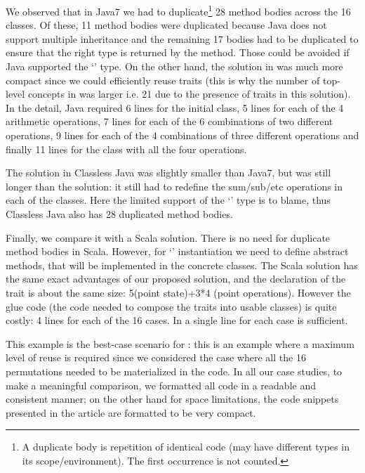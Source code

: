 \noindent We observed that in Java7 we had to duplicate\footnote{A duplicate body is repetition of identical code (may have different types in its scope/environment). The first occurrence is not counted. } 28 method bodies across the 16 classes.
Of these, 11 method bodies were duplicated because Java does not support multiple inheritance
 and the remaining 17 bodies had to be duplicated to ensure that the right type
 is returned by the method. Those could be avoided if Java supported
 the `\Q@This@' type.
 On the other hand, the solution in \name was much more compact since we could efficiently
reuse traits (this is why the number of top-level concepts in \name was larger i.e. 21 due to the
 presence of traits in this solution).
In the detail, Java required 6 lines for the initial \Q@Point@ class,
5 lines for each of the 4 arithmetic operations, 7 lines for each of the 6 combinations
of two different operations, 9 lines for each of the 4 combinations of three different 
operations and finally 11 lines for the class with all the four operations.


 The solution in Classless Java was slightly smaller than Java7,
 but was still longer than the \name solution: it still had to redefine the
 sum/sub/etc operations in each of the classes. Here the limited
 support of the `\Q@This@' type is to blame, thus Classless Java also has 28 duplicated method bodies.

Finally, we compare it with a Scala solution.
There is no need for duplicate method bodies in Scala.
However, for `\Q@This@' instantiation we need to define abstract methods, that will be implemented in the concrete classes.
The Scala solution has the same exact advantages
of our proposed solution, and the declaration
of the trait is about the same size: 
5(point state)+3*4 (point operations).
However the glue code (the code needed to compose the traits into usable classes) is quite costly:
4 lines for each of the 16 cases.
In \name a single line for each case is sufficient.

This example is the best-case scenario for \name: this is an example where a maximum level of reuse
 is required since we considered the case where all the 16 permutations needed to be materialized in the code.
In all our case studies, to make a meaningful comparison, we formatted all code in a readable and consistent manner;
on the other hand for space limitations, the code snippets presented in the article
are formatted to be very compact.


